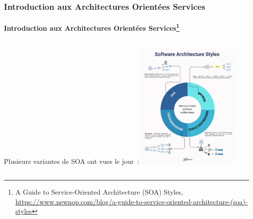 \documentclass{beamer}
\begin{document}
    \begin{frame}
        \transdissolve
        \frametitle{Introduction aux Architectures Orientées Services}
        \framesubtitle{Introduction aux Architectures Orientées Services\footnote{\label{newop-soa}A Guide to Service-Oriented Architecture (SOA) Styles, \url{https://www.newnop.com/blog/a-guide-to-service-oriented-architecture-(soa)-styles}}}
        \begin{columns}
            Plusieurs variantes de SOA ont vues le jour~:
            \centering
            \includegraphics[width=5cm]{image/diversity-of-soa}
        \end{columns}
    \end{frame}
\end{document}
